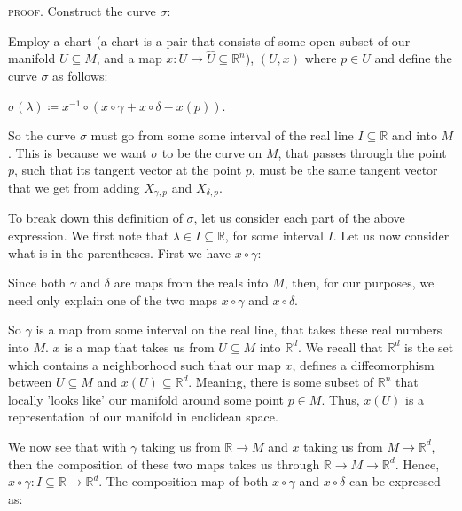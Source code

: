 \documentclass[12pt, a4paper]{article}
\begin{document}
\begin{flushleft}
\textsc{proof.} Construct the curve $\sigma$:
\end{flushleft}

Employ a chart (a chart is a pair that consists of some open subset of our manifold $U\subseteq M$, and a map $x\colon U\rightarrow\hat{U}\subseteq\mathbb{R}^n$), $(U, x)$ where $p\in U$ and define the curve $\sigma$ as follows:\par

\vspace{6mm}

\centerline{$\sigma(\lambda)\coloneqq x^{-1}\circ(x\circ\gamma + x\circ\delta - x(p))$.}

\vspace{6mm}

So the curve $\sigma$ must go from some some interval of the real line $I\subseteq\mathbb{R}$ and into $M$. This is because we want $\sigma$ to be the curve on $M$, that passes through the point $p$, such that its tangent vector at the point $p$, must be the same tangent vector that we get from adding $X_{\gamma, p}$ and $X_{\delta, p}$.\par
To break down this definition of $\sigma$, let us consider each part of the above expression. We first note that $\lambda\in I\subseteq\mathbb{R}$, for some interval $I$. Let us now consider what is in the parentheses. First we have $x\circ\gamma$:\par

\vspace{4mm}


Since both $\gamma$ and $\delta$ are maps from the reals into $M$, then, for our purposes, we need only explain one of the two maps $x\circ\gamma$ and $x\circ\delta$.\par
So $\gamma$ is a map from some interval on the real line, that takes these real numbers into $M$. $x$ is a map that takes us from $U\subseteq M$ into $\mathbb{R}^d$. We recall that $\mathbb{R}^d$ is the set which contains a neighborhood such that our map $x$, defines a diffeomorphism between $U\subseteq M$ and $x(U)\subseteq\mathbb{R}^d$. Meaning, there is some subset of $\mathbb{R}^n$ that locally 'looks like' our manifold around some point $p\in M$. Thus, $x(U)$ is a representation of our manifold in euclidean space.\par
We now see that with $\gamma$ taking us from $\mathbb{R}\rightarrow M$ and $x$ taking us from $M\rightarrow\mathbb{R}^d$, then the composition of these two maps takes us through $\mathbb{R}\rightarrow M\rightarrow\mathbb{R}^d$. Hence, $x\circ\gamma\colon I\subseteq\mathbb{R}\rightarrow \mathbb{R}^d$. The composition map of both $x\circ\gamma$ and $x\circ\delta$ can be expressed as:\par
\end{document}
